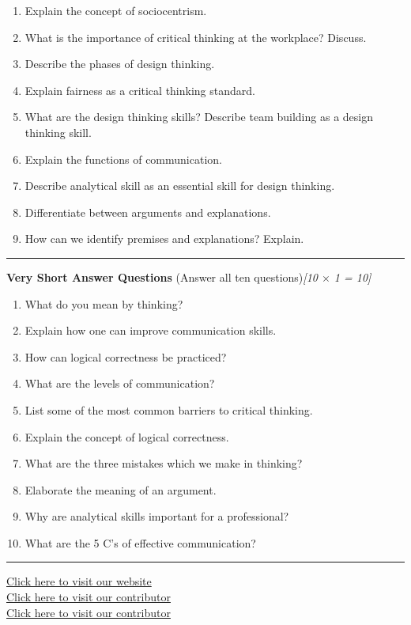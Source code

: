 \documentclass[11pt,a4paper]{article}
\newcommand{\pts}[1]{\hfill   \textit{[#1]}}
\begin{document}
\begin{enumerate}[label=\alph*.,leftmargin=*,itemsep=8pt]
  \item Explain the concept of sociocentrism.
  \item What is the importance of critical thinking at the workplace? Discuss.
  \item Describe the phases of design thinking.
  \item Explain fairness as a critical thinking standard.
  \item What are the design thinking skills? Describe team building as a design thinking skill.
  \item Explain the functions of communication.
  \item Describe analytical skill as an essential skill for design thinking.
  \item Differentiate between arguments and explanations.
  \item How can we identify premises and explanations? Explain.
\end{enumerate}

\bigskip



\rule{\linewidth}{0.4pt}\smallskip




\noindent   \textbf{Very Short Answer Questions} (Answer all ten questions)\pts{10 $ \times$ 1 = 10}

\begin{enumerate}[label=(\roman*),leftmargin=*,itemsep=6pt]
  \item What do you mean by thinking?
  \item Explain how one can improve communication skills.
  \item How can logical correctness be practiced?
  \item What are the levels of communication?
  \item List some of the most common barriers to critical thinking.
  \item Explain the concept of logical correctness.
  \item What are the three mistakes which we make in thinking?
  \item Elaborate the meaning of an argument.
  \item Why are analytical skills important for a professional?
  \item What are the 5 C's of effective communication?
\end{enumerate}

\vfill
\rule{\linewidth}{0.4pt}

\begin{center}\small
\href{https://bhu-exam.vercel.app/}{Click here to visit our website}\\[4pt]\href{https://me-aryan.vercel.app/}{Click here to visit our contributor}\\[4pt]\href{https://quashan-me.vercel.app/}{Click here to visit our contributor}
\end{center}
\end{document}
